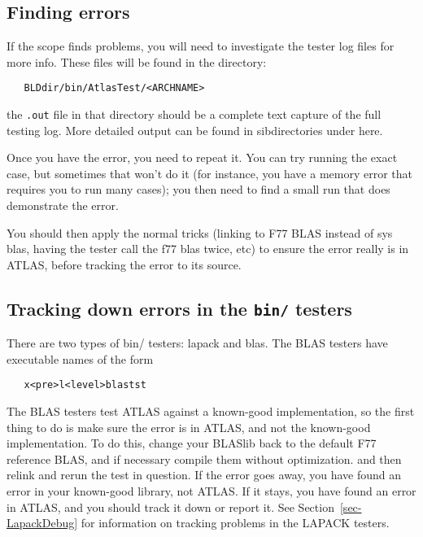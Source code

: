 \documentclass[11pt]{article}
\begin{document}
\subsection{Finding errors}
If the scope finds problems, you will need to investigate the tester 
log files for more info.  These files will be found in the directory:
\begin{verbatim}
   BLDdir/bin/AtlasTest/<ARCHNAME>
\end{verbatim}
the {\tt .out} file in that directory should be a complete text capture
of the full testing log.  More detailed output can be found in
sibdirectories under here.

Once you have the error, you need to repeat it.  You can try running the
exact case, but sometimes that won't do it (for instance, you have a memory
error that requires you to run many cases); you then need to find a small
run that does demonstrate the error.

You should then apply the normal tricks (linking to F77 BLAS instead of
sys blas, having the tester call the f77 blas twice, etc) to ensure the
error really is in ATLAS, before tracking the error to its source.

\subsection{Tracking down errors in the {\tt bin/} testers}
There are two types of bin/ testers: lapack and blas.  The BLAS testers
have executable names of the form 
\begin{verbatim}
   x<pre>l<level>blastst
\end{verbatim}
The BLAS testers test ATLAS against a known-good implementation, so the first
thing to do is make sure the error is in ATLAS, and not the known-good
implementation.  To do this, change your BLASlib back to the default
F77 reference BLAS, and if necessary compile them without optimization.
and then relink and rerun the
test in question.  If the error goes away, you have found an error in your
known-good library, not ATLAS.  If it stays, you have found an error in
ATLAS, and you should track it down or report it.
See Section~\ref{sec-LapackDebug} for information on tracking problems in the
LAPACK testers.
\end{document}
